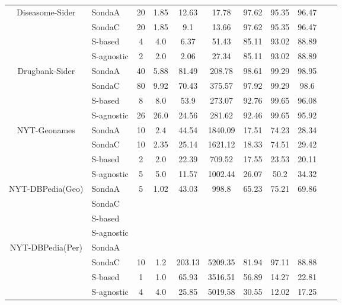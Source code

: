 \begin{center}
\begin{table*}[h]
\begin{tabular}{|c|l|c|c|c|c|c|c|c|c|c|}
\multirow{4}{*}{Diseasome-Sider} & SondaA    & 20 & 1.85   & 12.63  & 17.78   & 97.62 & 95.35 & 96.47  \\
											& SondaC   & 20 & 1.85   & 9.1  & 13.66   & 97.62 & 95.35 & 96.47 \\
											& S-based  & 4 & 4.0   & 6.37  & 51.43   & 85.11 & 93.02 & 88.89 \\
 											& S-agnostic    & 2 & 2.0   & 2.06  & 27.34   & 85.11 & 93.02 & 88.89  \\ \hline 		 									

\multirow{4}{*}{Drugbank-Sider} & SondaA    & 40 & 5.88   & 81.49  & 208.78    & 98.61 & 99.29 & 98.95 \\
											& SondaC	   & 80 & 9.92   & 70.43  & 375.57  & 97.92 & 99.29 & 98.6 \\
											& S-based     & 8 & 8.0   & 53.9  & 273.07  & 92.76 & 99.65 & 96.08\\
 											& S-agnostic   & 26 & 26.0   & 24.56  & 281.62   & 92.46 & 99.65 & 95.92 \\ \hline 											 

\multirow{4}{*}{NYT-Geonames} & SondaA     & 10 & 2.4   & 44.54  & 1840.09 & 17.51 & 74.23 & 28.34 \\
											& SondaC   & 10 & 2.35   & 25.14  & 1621.12 & 18.33 & 74.51 & 29.42 \\
											& S-based   & 2 & 2.0   & 22.39  & 709.52 & 17.55 & 23.53 & 20.11  \\
 											& S-agnostic    & 5 & 5.0   & 11.57  & 1002.44  & 26.07 & 50.2 & 34.32  \\ \hline 											


\multirow{4}{*}{NYT-DBPedia(Geo)} & SondaA    & 5 & 1.02   & 43.03  & 998.8  & 65.23 & 75.21 & 69.86 \\
											& SondaC  \\
											& S-based \\
 											& S-agnostic       \\ \hline 											
 		
\multirow{4}{*}{NYT-DBPedia(Per)} & SondaA   \\
											& SondaC   & 10 & 1.2   & 203.13  & 5209.35 & 81.94 & 97.11 & 88.88 \\
											& S-based  & 1 & 1.0   & 65.93  & 3516.51  & 56.89 & 14.27 & 22.81 \\
 											& S-agnostic     & 4 & 4.0   & 25.85  & 5019.58   & 30.55 & 12.02 & 17.25  \\ \hline 			
 																			

\end{tabular}
\end{table*}
\end{center}
